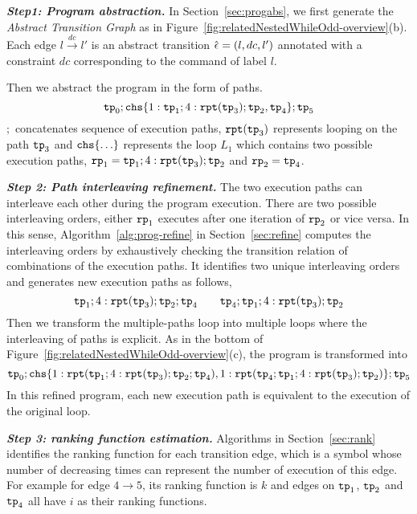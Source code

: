 
\textbf{\emph{Step1: Program abstraction.}}
In Section~\ref{sec:progabs},
we first 
generate the \emph{Abstract Transition Graph} as in Figure~\ref{fig:relatedNestedWhileOdd-overview}(b).
Each edge $l \xrightarrow{dc} l'$ is an abstract transition $\hat{\mathtt{\epsilon}{}} = (l, dc, l')$ annotated with a constraint $dc$ corresponding to the command of label $l$.

Then we abstract the program in the form of paths.
$$
\tpath_0 ; \rpchoose{ 1: \tpath_1; 4:\rprepeat(\tpath_3); \tpath_2, \tpath_4 }; \tpath_5
$$
$;$ concatenates sequence of execution paths,
$\mathtt{rpt}(\mathtt{tp}_3)$ represents looping on the path $\mathtt{tp}_3$ and
$\rpchoose{ \ldots}$ represents the loop $L_1$ which contains two possible execution paths,
$\mathtt{rp}_1 = \mathtt{tp}_1; 4:\mathtt{rpt}(\mathtt{tp}_3);\mathtt{tp}_2$ and $\mathtt{rp}_2 =\mathtt{tp}_4$.

\textbf{\emph{Step 2: Path interleaving refinement.}} 
The two execution paths
can interleave each other during the program execution.
There are two possible interleaving orders,
either $\mathtt{rp}_1$ executes after one iteration of $\mathtt{rp}_2$ or vice versa.
In this sense, Algorithm~\ref{alg:prog-refine} in Section~\ref{sec:refine} computes the interleaving orders
by exhaustively checking the transition relation of combinations of the execution paths.
It identifies two unique interleaving orders and generates new execution paths as follows,
\[
\mathtt{tp}_1; 4:\mathtt{rpt}(\mathtt{tp}_3); \mathtt{tp}_2; \mathtt{tp}_4
\qquad
\mathtt{tp}_4; \mathtt{tp}_1; 4:\mathtt{rpt}(\mathtt{tp}_3); \mathtt{tp}_2
\]
Then we transform the multiple-paths loop
into multiple loops where
the interleaving of paths is explicit.
As in the bottom of Figure~\ref{fig:relatedNestedWhileOdd-overview}(c),
the program is transformed into 
\[
    \tpath_0 ; \rpchoose{ 1: \rprepeat(\tpath_1; 4:\rprepeat(\tpath_3); \tpath_2; \tpath_4), 
1: \rprepeat(\tpath_4; \tpath_1; 4:\rprepeat(\tpath_3); \tpath_2) }; \tpath_5
\]
In this refined program, 
each new execution path is equivalent to the execution of the original loop. 

\textbf{\emph{Step 3: ranking function estimation.}}
Algorithms in Section~\ref{sec:rank} identifies the ranking function for each transition edge, which is a symbol whose number of decreasing times can represent the number of execution of this edge.
For example for edge $4 \to 5$, its ranking function is $k$ and edges on $\mathtt{tp}_1$, $\mathtt{tp}_2$ and $\mathtt{tp}_4$ all have $i$ as their ranking functions.

